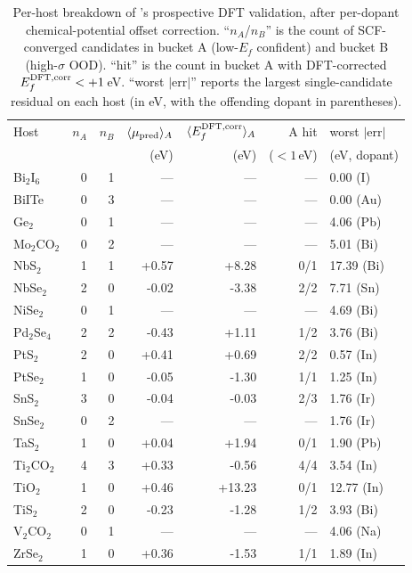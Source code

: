\begin{table}[h]
\centering
\caption{Per-host breakdown of \modelname's prospective DFT validation, after per-dopant chemical-potential offset correction. ``$n_A$/$n_B$'' is the count of SCF-converged candidates in bucket A (low-$E_f$ confident) and bucket B (high-$\sigma$ OOD). ``hit'' is the count in bucket A with DFT-corrected $E_f^{\rm DFT,corr}<+1$\,eV. ``worst $|\mathrm{err}|$'' reports the largest single-candidate residual on each host (in eV, with the offending dopant in parentheses).}
\label{tab:per-host}
\begin{tabular}{lrrrrrl}
\toprule
Host & $n_A$ & $n_B$ & $\langle\mu_{\rm pred}\rangle_A$ & $\langle E_f^{\rm DFT,corr}\rangle_A$ & A hit & worst $|\mathrm{err}|$ \\
      &  &  & (eV) & (eV) & ($<\!1$\,eV) & (eV, dopant) \\
\midrule
  Bi$_2$I$_6$          & 0 & 1 & --- & --- & --- & 0.00 (I) \\
  BiITe                & 0 & 3 & --- & --- & --- & 0.00 (Au) \\
  Ge$_2$               & 0 & 1 & --- & --- & --- & 4.06 (Pb) \\
  Mo$_2$CO$_2$         & 0 & 2 & --- & --- & --- & 5.01 (Bi) \\
  NbS$_2$              & 1 & 1 & +0.57 & +8.28 & 0/1 & 17.39 (Bi) \\
  NbSe$_2$             & 2 & 0 & -0.02 & -3.38 & 2/2 & 7.71 (Sn) \\
  NiSe$_2$             & 0 & 1 & --- & --- & --- & 4.69 (Bi) \\
  Pd$_2$Se$_4$         & 2 & 2 & -0.43 & +1.11 & 1/2 & 3.76 (Bi) \\
  PtS$_2$              & 2 & 0 & +0.41 & +0.69 & 2/2 & 0.57 (In) \\
  PtSe$_2$             & 1 & 0 & -0.05 & -1.30 & 1/1 & 1.25 (In) \\
  SnS$_2$              & 3 & 0 & -0.04 & -0.03 & 2/3 & 1.76 (Ir) \\
  SnSe$_2$             & 0 & 2 & --- & --- & --- & 1.76 (Ir) \\
  TaS$_2$              & 1 & 0 & +0.04 & +1.94 & 0/1 & 1.90 (Pb) \\
  Ti$_2$CO$_2$         & 4 & 3 & +0.33 & -0.56 & 4/4 & 3.54 (In) \\
  TiO$_2$              & 1 & 0 & +0.46 & +13.23 & 0/1 & 12.77 (In) \\
  TiS$_2$              & 2 & 0 & -0.23 & -1.28 & 1/2 & 3.93 (Bi) \\
  V$_2$CO$_2$          & 0 & 1 & --- & --- & --- & 4.06 (Na) \\
  ZrSe$_2$             & 1 & 0 & +0.36 & -1.53 & 1/1 & 1.89 (In) \\
\bottomrule
\end{tabular}
\end{table}
